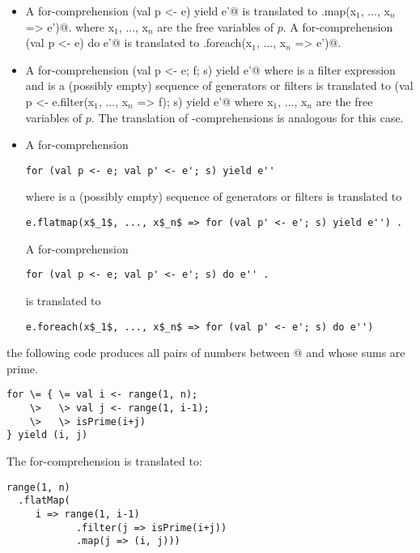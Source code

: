 \documentclass[11pt]{report}
\begin{document}
\begin{itemize}
\item
A for-comprehension
\verb@for (val p <- e) yield e'@
is translated to
\verb@e.map(x$_1$, ..., x$_n$ => e')@.
where x$_1$, ..., x$_n$ are the free variables of $p$.
A for-comprehension
\verb@for (val p <- e) do e'@
is translated to
\verb@e.foreach(x$_1$, ..., x$_n$ => e')@.
\item
A for-comprehension
\verb@for (val p <- e; f; s) yield e'@
where \verb@f@ is a filter expression and \verb@s@ is a (possibly empty)
sequence of generators or filters
is translated to
\verb@for (val p <- e.filter(x$_1$, ..., x$_n$ => f); s) yield e'@
where x$_1$, ..., x$_n$ are the free variables of $p$. The translation
of \verb@for@-\verb@do@ comprehensions is analogous for this case.
\item
A for-comprehension
\begin{verbatim}
for (val p <- e; val p' <- e'; s) yield e''
\end{verbatim}
where \verb@s@ is a (possibly empty)
sequence of generators or filters
is translated to
\begin{verbatim}
e.flatmap(x$_1$, ..., x$_n$ => for (val p' <- e'; s) yield e'') .
\end{verbatim}
A for-comprehension
\begin{verbatim}
for (val p <- e; val p' <- e'; s) do e'' .
\end{verbatim}
is translated to
\begin{verbatim}
e.foreach(x$_1$, ..., x$_n$ => for (val p' <- e'; s) do e'')
\end{verbatim}
\end{itemize}

\example
the following code produces all pairs of numbers
between @ and \verb@n@ whose sums are prime.
\begin{verbatim}
for \= { \= val i <- range(1, n);
    \>   \> val j <- range(1, i-1);
    \>   \> isPrime(i+j)
} yield (i, j)
\end{verbatim}
The for-comprehension is translated to:
\begin{verbatim}
range(1, n)
  .flatMap(
     i => range(1, i-1)
            .filter(j => isPrime(i+j))
            .map(j => (i, j)))
\end{verbatim}
\end{document}
